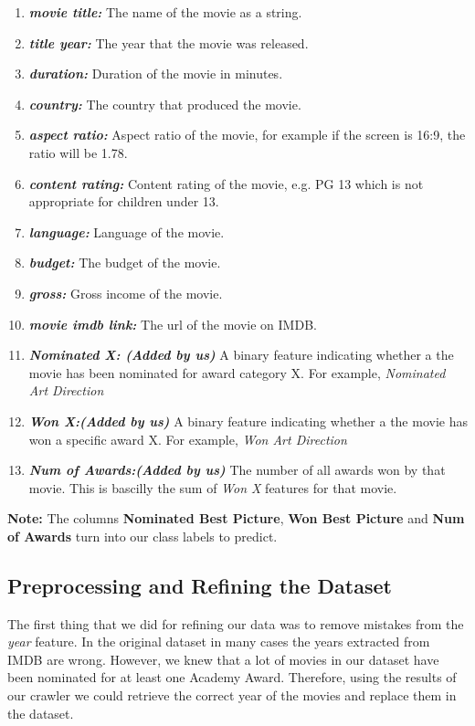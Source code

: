 \documentclass[journal,transmag]{IEEEtran}
\begin{document}
\begin{enumerate}
\item{\textbf{\textit{movie title:}}} The name of the movie as a string.
\item{\textbf{\textit{title year:}}} The year that the movie was released.
\item{\textbf{\textit{duration:}}} Duration of the movie in minutes.
\item{\textbf{\textit{country:}}} The country that produced the movie.
\item{\textbf{\textit{aspect ratio:}}} Aspect ratio of the movie, for example if the screen is 16:9, the ratio will be 1.78.
\item{\textbf{\textit{content rating:}}} Content rating of the movie, e.g. PG 13 which is not appropriate for children under 13.
\item{\textbf{\textit{language:}}} Language of the movie.
\item{\textbf{\textit{budget:}}} The budget of the movie.
\item{\textbf{\textit{gross:}}} Gross income of the movie.
\item{\textbf{\textit{movie imdb link:}}} The url of the movie on IMDB.
\item{\textbf{\textit{Nominated X: (Added by us)}}} A binary feature indicating whether a the movie has been nominated for award category X. For example, \textit{Nominated Art Direction}
\item{\textbf{\textit{Won X:(Added by us)}}} A binary feature indicating whether a the movie has won a specific award X. For example, \textit{Won Art Direction}
\item{\textbf{\textit{Num of Awards:(Added by us)}}} The number of all awards won by that movie. This is bascilly the sum of \textit{Won X} features for that movie.
\end{enumerate}

\textbf{Note:} The columns \textbf{Nominated Best Picture}, \textbf{Won Best Picture} and \textbf{Num of Awards} turn into our class labels to predict.

\subsection{Preprocessing and Refining the Dataset}
The first thing that we did for refining our data was to remove mistakes from the \textit{year} feature. In the original dataset in many cases the years extracted from IMDB are wrong. However, we knew that a lot of movies in our dataset have been nominated for at least one Academy Award. Therefore, using the results of our crawler we could retrieve the correct year of the movies and replace them in the dataset.\\
\end{document}
